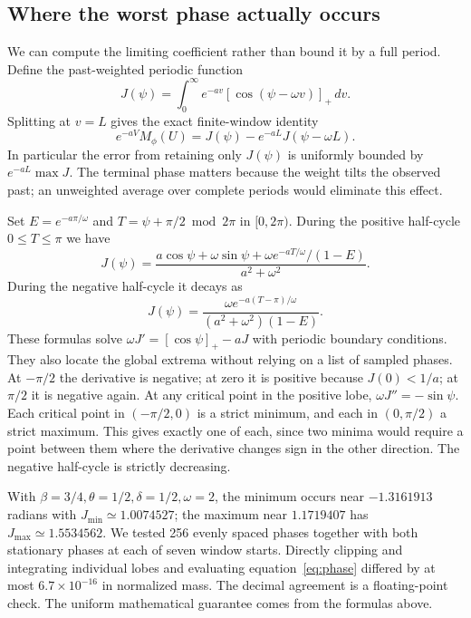 \documentclass[12pt,letterpaper]{article}
\begin{document}
\subsection{Where the worst phase actually occurs}
We can compute the limiting coefficient rather than bound it by a full period. Define the past-weighted periodic function
\[
 J(\psi)=\int_0^\infty e^{-av}[\cos(\psi-\omega v)]_+\,dv .
\]
Splitting at \(v=L\) gives the exact finite-window identity
\begin{equation}
     e^{-aV}M_\phi(U)=J(\psi)-e^{-aL}J(\psi-\omega L).
     \label{eq:phase}
\end{equation}
In particular the error from retaining only \(J(\psi)\) is uniformly bounded by \(e^{-aL}\max J\). The terminal phase matters because the weight tilts the observed past; an unweighted average over complete periods would eliminate this effect.

Set \(E=e^{-a\pi/\omega}\) and \(T=\psi+\pi/2\bmod 2\pi\) in \([0,2\pi)\). During the positive half-cycle \(0\le T\le\pi\) we have
\[
 J(\psi)=\frac{a\cos\psi+\omega\sin\psi+
          \omega e^{-aT/\omega}/(1-E)}{a^2+\omega^2}.
\]
During the negative half-cycle it decays as
\[
 J(\psi)=\frac{\omega e^{-a(T-\pi)/\omega}}{(a^2+\omega^2)(1-E)}.
\]
These formulas solve \(\omega J'=[\cos\psi]_+-aJ\) with periodic boundary conditions. They also locate the global extrema without relying on a list of sampled phases. At \(-\pi/2\) the derivative is negative; at zero it is positive because \(J(0)<1/a\); at \(\pi/2\) it is negative again. At any critical point in the positive lobe, \(\omega J''=-\sin\psi\). Each critical point in \((-\pi/2,0)\) is a strict minimum, and each in \((0,\pi/2)\) a strict maximum. This gives exactly one of each, since two minima would require a point between them where the derivative changes sign in the other direction. The negative half-cycle is strictly decreasing.

With \(\beta=3/4,\theta=1/2,\delta=1/2,\omega=2\), the minimum occurs near \(-1.3161913\) radians with \(J_{\min}\simeq1.0074527\); the maximum near \(1.1719407\) has \(J_{\max}\simeq1.5534562\). We tested 256 evenly spaced phases together with both stationary phases at each of seven window starts. Directly clipping and integrating individual lobes and evaluating equation~\eqref{eq:phase} differed by at most \(6.7\times10^{-16}\) in normalized mass. The decimal agreement is a floating-point check. The uniform mathematical guarantee comes from the formulas above.
\end{document}
